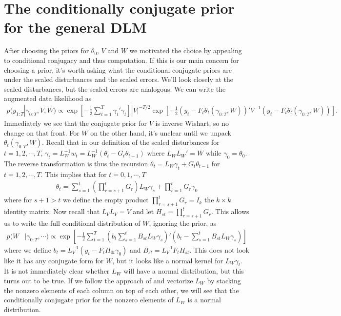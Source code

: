 \documentclass{article}
\begin{document}
\section{The conditionally conjugate prior for the general DLM}
After choosing the priors for $\theta_0$, $V$ and $W$ we motivated the choice by appealing to conditional conjugacy and thus computation. If this is our main concern for choosing a prior,  it's worth asking what the conditional conjugate priors are under the scaled disturbances and the scaled errors. We'll look closely at the scaled disturbances, but the scaled errors are analogous. We can write the augmented data likelihood as
\begin{align*}
  p(y_{1:T}|\gamma_{0:T}, V, W) \propto \exp\left[-\frac{1}{2}\sum_{t=1}^T\gamma_t'\gamma_t\right]|V|^{-T/2}\exp\left[-\frac{1}{2}\left(y_t - F_t\theta_t(\gamma_{0:T},W)\right)'V^{-1}\left(y_t - F_t\theta_t(\gamma_{0:T},W)\right)\right].
\end{align*}
Immediately we see that the conjugate prior for $V$ is inverse Wishart, so no change on that front. For $W$ on the other hand, it's unclear until we unpack $\theta_t(\gamma_{0:T},W)$. Recall that in our definition of the scaled disturbances for $t=1,2,\cdots,T$, $\gamma_t = L_W^{-1}w_t = L_W^{-1}(\theta_t - G_t\theta_{t-1})$ where $L_WL_W' = W$ while $\gamma_0=\theta_0$. The reverse transformation is thus the recursion $\theta_t = L_W\gamma_t + G_t\theta_{t-1}$ for $t=1,2,\cdots,T$. This implies that for $t=0,1,\cdots,T$
\begin{align*}
  \theta_t = \sum_{s=1}^t\left(\prod_{r=s+1}^tG_r\right)L_W\gamma_s + \prod_{r=1}^tG_r\gamma_0
\end{align*}
where for $s+1>t$ we define the empty product $\prod_{r=s+1}^tG_r = I_k$ the $k\times k$ identity matrix. Now recall that $L_VL_V = V$ and let $H_{st} = \prod_{r=s+1}^tG_r$. This allows us to write the full conditional distribution of $W$, ignoring the prior, as
\begin{align*}
  p(W&|\gamma_{0:T},\cdots)  \propto \exp\left[-\frac{1}{2}\sum_{t=1}^T\left(b_t \sum_{s=1}^tB_{st}L_W\gamma_s\right)'\left(b_t - \sum_{s=1}^tB_{st}L_W\gamma_s\right)\right]
\end{align*}
where we define $b_t = L_V^{-1}(y_t - F_tH_{0t}\gamma_0)$ and $B_{st} = L_V^{-1}F_tH_{st}$. This does not look like it has any conjugate form for $W$, but it looks like a normal kernel for $L_W\gamma_t$. It is not immediately clear whether $L_W$ will have a normal distribution, but this turns out to be true. If we follow the approach of \cite{fruhwirth2008bayesian} and vectorize $L_W$ by stacking the nonzero elements of each column on top of each other, we will see that the conditionally conjugate prior for the nonzero elements of $L_W$ is a normal distribution.
\end{document}
